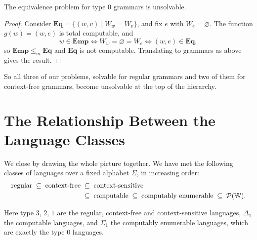 \documentclass[a4paper]{scrartcl}
\newcommand{\WW}{\mathbb{W}}
\newcommand{\KK}{\mathbb{K}}
\newcommand{\Emp}{\mathbf{Emp}}
\newcommand{\Eq}{\mathbf{Eq}}
\begin{document}
\begin{corollary}
	The equivalence problem for type $0$ grammars is unsolvable.
\end{corollary}

\begin{proof}
	Consider $\Eq = \{(w,v) \mid W_w = W_v\}$, and fix $e$ with $W_e = \varnothing$. The function $g(w) = (w,e)$ is total computable, and
	$$w \in \Emp \iff W_w = \varnothing = W_e \iff (w,e) \in \Eq,$$
	so $\Emp \leq_m \Eq$ and $\Eq$ is not computable. Translating to grammars as above gives the result.
\end{proof}

So all three of our problems, solvable for regular grammars and two of them for context-free grammars, become unsolvable at the top of the hierarchy.

\section{The Relationship Between the Language Classes}

We close by drawing the whole picture together. We have met the following classes of languages over a fixed alphabet $\Sigma$, in increasing order:
\begin{align*}
	\text{regular} \;\subseteq\; \text{context-free} &\;\subseteq\; \text{context-sensitive} \\
	&\;\subseteq\; \text{computable} \;\subseteq\; \text{computably enumerable} \;\subseteq\; \power(\WW).
\end{align*}

\begin{center}
\end{center}
Here type $3$, $2$, $1$ are the regular, context-free and context-sensitive languages, $\Delta_1$ the computable languages, and $\Sigma_1$ the computably enumerable languages, which are exactly the type $0$ languages.
\end{document}
